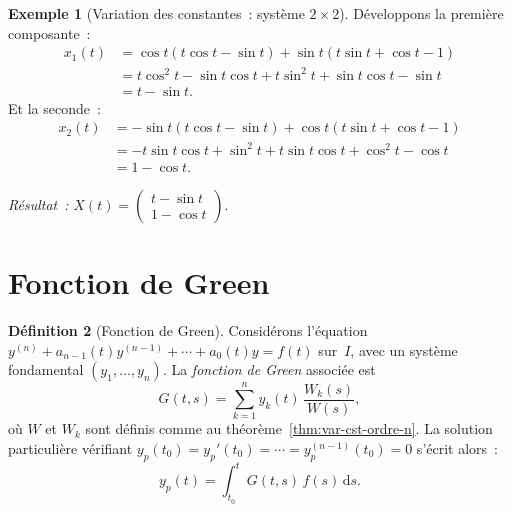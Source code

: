 \documentclass[12pt,a4paper,openany]{book}
\theoremstyle{definition}
\newtheorem{definition}{Définition}[chapter]
\newtheorem{exemple}[definition]{Exemple}
\theoremstyle{plain}
\theoremstyle{remark}
\newcommand{\dd}{\mathrm{d}}
\begin{document}
\begin{exemple}[Variation des constantes~: système $2\times 2$]
  Développons la première composante~:
  \begin{align*}
    x_1(t) &= \cos t(t\cos t - \sin t) + \sin t(t\sin t + \cos t - 1) \\
    &= t\cos^2 t - \sin t\cos t + t\sin^2 t + \sin t\cos t - \sin t \\
    &= t - \sin t.
  \end{align*}
  Et la seconde~:
  \begin{align*}
    x_2(t) &= -\sin t(t\cos t - \sin t) + \cos t(t\sin t + \cos t - 1) \\
    &= -t\sin t\cos t + \sin^2 t + t\sin t\cos t + \cos^2 t - \cos t \\
    &= 1 - \cos t.
  \end{align*}

  \emph{Résultat~:} $X(t) = \begin{pmatrix} t - \sin t \\ 1 - \cos t \end{pmatrix}$.
\end{exemple}

\section{Fonction de Green}\label{sec:green}

\begin{definition}[Fonction de Green]\label{def:green}
  Considérons l'équation $y^{(n)} + a_{n-1}(t)y^{(n-1)} + \cdots + a_0(t)y = f(t)$
  sur~$I$, avec un système fondamental $(y_1,\ldots,y_n)$. La
  \emph{fonction de Green} associée est
  \begin{equation}\label{eq:green-def}
    G(t,s) = \sum_{k=1}^n y_k(t)\,\frac{W_k(s)}{W(s)},
  \end{equation}
  où $W$ et $W_k$ sont définis comme au théorème~\ref{thm:var-cst-ordre-n}.
  La solution particulière vérifiant $y_p(t_0) = y_p'(t_0) = \cdots
  = y_p^{(n-1)}(t_0) = 0$ s'écrit alors~:
  \begin{equation}\label{eq:sol-green}
    y_p(t) = \int_{t_0}^t G(t,s)\,f(s)\,\dd s.
  \end{equation}
\end{definition}
\end{document}
